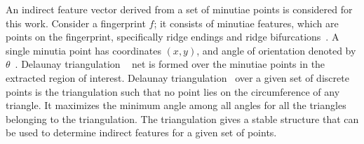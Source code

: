 An indirect feature vector derived from a set of minutiae points is considered
for this work. Consider a fingerprint $f$; it consists of minutiae
features, which are points on the fingerprint, specifically ridge endings and
ridge bifurcations~\cite{liu2017feature}. A single minutia point has coordinates
$(x,y)$, and angle of orientation denoted by $\theta$~\cite{liu2017feature}.
Delaunay triangulation ~\cite{lee1980two} net is formed over the minutiae points in the
extracted region of interest. Delaunay triangulation~\cite{lee1980two} over a
given set of discrete points is the triangulation such that no point lies on the
circumference of any triangle. It maximizes the minimum angle among all angles
for all the triangles belonging to the triangulation. The triangulation gives a
stable structure that can be used to determine indirect features for a given
set of points. \par

